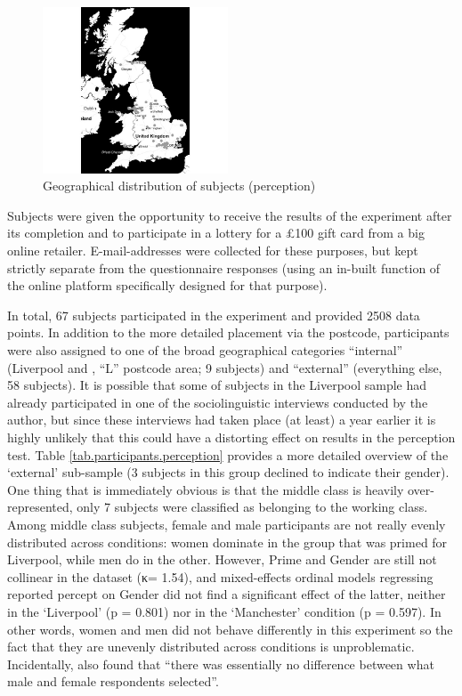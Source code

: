 \begin{figure}[h]
	\centering
	\includegraphics[width=0.49\textwidth]{./figures/participant_map}
	\caption{Geographical distribution of subjects (perception)}
	\label{fig.per.subjects}
\end{figure}

Subjects were given the opportunity to receive the results of the experiment after its completion and to participate in a lottery for a £100 gift card from a big online retailer.
E-mail-addresses were collected for these purposes, but kept strictly separate from the questionnaire responses (using an in-built function of the online platform specifically designed for that purpose).

In total, 67 subjects participated in the experiment and provided 2508 data points.
In addition to the more detailed placement via the postcode, participants were also assigned to one of the broad geographical categories ``internal'' (Liverpool and , ``L'' postcode area; 9 subjects) and ``external'' (everything else, 58 subjects).
It is possible that some of subjects in the Liverpool sample had already participated in one of the sociolinguistic interviews conducted by the author, but since these interviews had taken place (at least) a year earlier it is highly unlikely that this could have a distorting effect on results in the perception test.
Table \ref{tab.participants.perception} provides a more detailed overview of the `external' sub-sample (3 subjects in this group declined to indicate their gender).
One thing that is immediately obvious is that the middle class is heavily over-represented, only 7 subjects were classified as belonging to the working class.
Among middle class subjects, female and male participants are not really evenly distributed across  conditions: women dominate in the group that was primed for Liverpool, while men do in the other.
However, Prime and Gender are still not collinear in the dataset (κ= 1.54), and mixed-effects ordinal models regressing reported percept on Gender did not find a significant effect of the latter, neither in the `Liverpool' (p = 0.801) nor in the `Manchester' condition (p = 0.597).
In other words, women and men did not behave differently in this experiment so the fact that they are unevenly distributed across conditions is unproblematic.
Incidentally, \textcite[69 and 79--80]{niedzielski1999} also found that \enquote{there was essentially no difference between what male and female respondents selected}.

